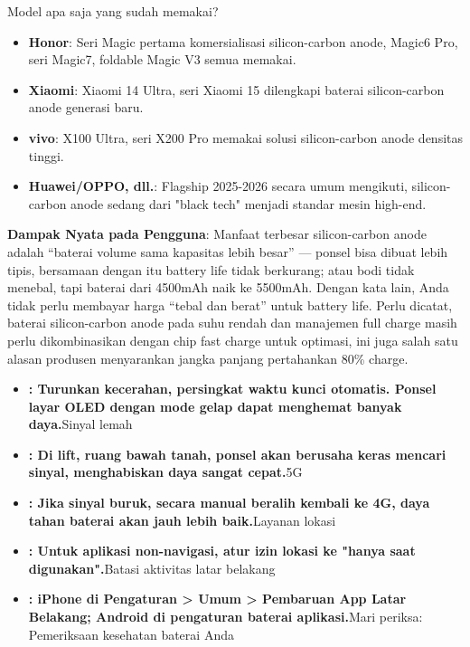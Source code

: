\begin{tcbinfo}{Model apa saja yang sudah memakai?}
\begin{itemize}
  \item \textbf{Honor}: Seri Magic pertama komersialisasi silicon-carbon anode, Magic6 Pro, seri Magic7, foldable Magic V3 semua memakai.
  \item \textbf{Xiaomi}: Xiaomi 14 Ultra, seri Xiaomi 15 dilengkapi baterai silicon-carbon anode generasi baru.
  \item \textbf{vivo}: X100 Ultra, seri X200 Pro memakai solusi silicon-carbon anode densitas tinggi.
  \item \textbf{Huawei/OPPO, dll.}: Flagship 2025-2026 secara umum mengikuti, silicon-carbon anode sedang dari "black tech" menjadi standar mesin high-end.
\end{itemize}

\end{tcbinfo}

\textbf{Dampak Nyata pada Pengguna}: Manfaat terbesar silicon-carbon anode adalah “baterai volume sama kapasitas lebih besar” — ponsel bisa dibuat lebih tipis, bersamaan dengan itu battery life tidak berkurang; atau bodi tidak menebal, tapi baterai dari 4500mAh naik ke 5500mAh. Dengan kata lain, Anda tidak perlu membayar harga “tebal dan berat” untuk battery life. Perlu dicatat, baterai silicon-carbon anode pada suhu rendah dan manajemen full charge masih perlu dikombinasikan dengan chip fast charge untuk optimasi, ini juga salah satu alasan produsen menyarankan jangka panjang pertahankan 80\% charge.


\begin{itemize}
  \item \textbf{: Turunkan kecerahan, persingkat waktu kunci otomatis. Ponsel layar OLED dengan mode gelap dapat menghemat banyak daya.}Sinyal lemah
  \item \textbf{: Di lift, ruang bawah tanah, ponsel akan berusaha keras mencari sinyal, menghabiskan daya sangat cepat.}5G
  \item \textbf{: Jika sinyal buruk, secara manual beralih kembali ke 4G, daya tahan baterai akan jauh lebih baik.}Layanan lokasi
  \item \textbf{: Untuk aplikasi non-navigasi, atur izin lokasi ke "hanya saat digunakan".}Batasi aktivitas latar belakang
  \item \textbf{: iPhone di Pengaturan > Umum > Pembaruan App Latar Belakang; Android di pengaturan baterai aplikasi.}Mari periksa: Pemeriksaan kesehatan baterai Anda
\end{itemize}

